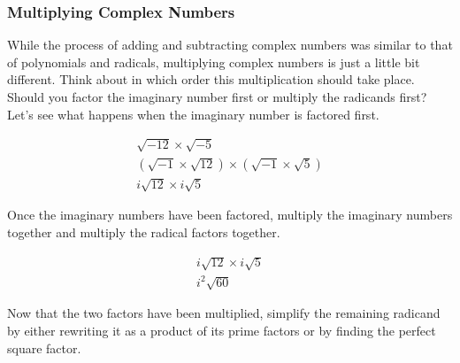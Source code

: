 
\subsubsection*{Multiplying Complex Numbers}

While the process of adding and subtracting complex numbers was similar to that
of polynomials and radicals, multiplying complex numbers is just a little bit
different. Think about in which order this multiplication should take place.
Should you factor the imaginary number first or multiply the radicands first?
Let's see what happens when the imaginary number is factored first.

\begin{align*}
    \sqrt{-12} \times \sqrt{-5} \\
    (\sqrt{-1} \times \sqrt{12}) \times (\sqrt{-1} \times \sqrt{5}) \\
    i \sqrt{12} \times i \sqrt{5}
\end{align*}

Once the imaginary numbers have been factored, multiply the imaginary numbers
together and multiply the radical factors together.

\begin{align*}
    i\sqrt{12} \times i\sqrt{5} \\
    i^2 \sqrt{60}
\end{align*}

Now that the two factors have been multiplied, simplify the remaining radicand
by either rewriting it as a product of its prime factors or by finding the
perfect square factor.

\newpage
